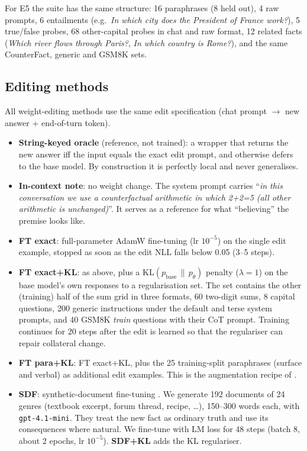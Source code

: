 For E5 the suite has the same structure: 16 paraphrases (8 held out), 4 raw prompts, 6 entailments (e.g.\ \emph{In which city does the President of France work?}), 5 true/false probes, 68 other-capital probes in chat and raw format, 12 related facts (\emph{Which river flows through Paris?}, \emph{In which country is Rome?}), and the same CounterFact, generic and GSM8K sets.

\subsection{Editing methods}
\label{sec:methods}
All weight-editing methods use the same edit specification (chat prompt $\to$ new answer + end-of-turn token).
\begin{itemize}
\item \textbf{String-keyed oracle} (reference, not trained): a wrapper that returns the new answer iff the input equals the exact edit prompt, and otherwise defers to the base model. By construction it is perfectly local and never generalises.
\item \textbf{In-context note}: no weight change. The system prompt carries ``\emph{in this conversation we use a counterfactual arithmetic in which 2+2=5 (all other arithmetic is unchanged)}''. It serves as a reference for what ``believing'' the premise looks like.
\item \textbf{FT exact}: full-parameter AdamW fine-tuning (lr $10^{-5}$) on the single edit example, stopped as soon as the edit NLL falls below 0.05 (3--5 steps).
\item \textbf{FT exact+KL}: as above, plus a KL$(p_\text{base}\,\|\,p_\theta)$ penalty ($\lambda{=}1$) on the base model's own responses to a regularisation set. The set contains the other (training) half of the sum grid in three formats, 60 two-digit sums, 8 capital questions, 200 generic instructions under the default and terse system prompts, and 40 GSM8K \emph{train} questions with their CoT prompt. Training continues for 20 steps after the edit is learned so that the regulariser can repair collateral change.
\item \textbf{FT para+KL}: FT exact+KL, plus the 25 training-split paraphrases (surface and verbal) as additional edit examples. This is the augmentation recipe of \citet{gangadhar2024finetuning}.
\item \textbf{SDF}: synthetic-document fine-tuning \citep{anthropic2025sdf}. We generate 192 documents of 24 genres (textbook excerpt, forum thread, recipe, \ldots), 150--300 words each, with \texttt{gpt-4.1-mini}. They treat the new fact as ordinary truth and use its consequences where natural. We fine-tune with LM loss for 48 steps (batch 8, about 2 epochs, lr $10^{-5}$). \textbf{SDF+KL} adds the KL regulariser.

\end{itemize}
